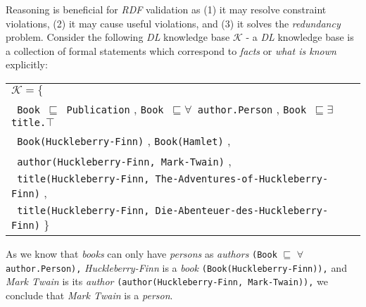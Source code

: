 \documentclass{acm_proc_article-sp}
\newcommand{\ms}[1]{%
  \texttt{#1}
}
\newenvironment{DL}{
  \vspace{0cm}
  \begin{tabular}{l l}

}{
  \end{tabular}
}
\begin{document}
Reasoning is beneficial for \emph{RDF} validation as 
(1) it may resolve constraint violations, 
(2) it may cause useful violations, and 
(3) it solves the \emph{redundancy} problem. 
Consider the following \emph{DL} knowledge base $\mathcal{K}$ - a \emph{DL} knowledge base is a collection of formal statements  which correspond to \emph{facts} or  \emph{what is known} explicitly:
{\scriptsize
\begin{center}
\begin{DL} 
$\mathcal{K}=\{$ \\ 
 \ms{ Book $\sqsubseteq$ Publication}, \ms{Book $\sqsubseteq \forall$ author.Person}, \ms{Book $\sqsubseteq \exists$ title.$\top$}\\
 \ms{ Book(Huckleberry-Finn)}, \ms{Book(Hamlet)},\\
 \ms{ author(Huckleberry-Finn, Mark-Twain)},\\
 \ms{ title(Huckleberry-Finn, The-Adventures-of-Huckleberry-Finn)},\\
 \ms{ title(Huckleberry-Finn, Die-Abenteuer-des-Huckleberry-Finn)}\}\\ 
\end{DL}
\end{center}
}%
As we know that \emph{books} can only have \emph{persons} as \emph{authors} {\small \ms{(Book} \ms{$\sqsubseteq$} \ms{$\forall$} \ms{author.Person),}} 
{\em Huckleberry-Finn} is a \emph{book}  {\small\ms{(Book(Huckleberry-Finn)),}} 
and \emph{Mark Twain} is its \emph{author} {\small\ms{(author(Huckleberry-Finn, Mark-Twain)),}}
we conclude that \emph{Mark Twain} is a \emph{person}.
\end{document}
